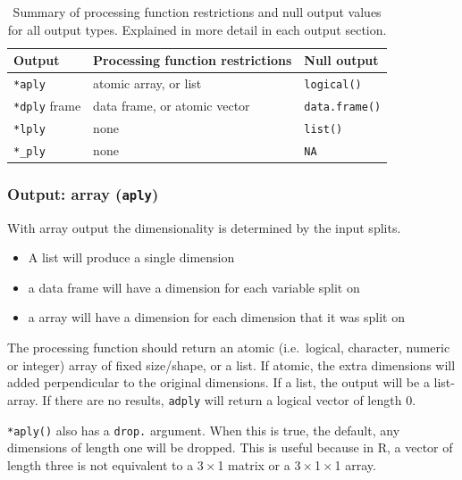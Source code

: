 \documentclass[letterpage]{scrartcl}
\newcommand{\code}[1]{\lstinline!#1!}
\newcommand{\f}[1]{\lstinline!#1()!}
\begin{document}
\begin{table}
  \begin{center}
  \begin{tabular}{lll}
    \toprule
    Output & Processing function restrictions & Null output \\
    \midrule
     \code{*aply} & atomic array, or list & \f{logical} \\
     \code{*dply} frame  & data frame, or atomic vector & \f{data.frame}\\
     \code{*lply} & none & \f{list} \\
     \code{*_ply} & none & \code{NA} \\
     \bottomrule  
  \end{tabular}
  \end{center}
  \caption{Summary of processing function restrictions and null output values for all output types.  Explained in more detail in each output section. }
  \label{tbl:restrictions}
\end{table}


\subsubsection{Output: array ({\tt *aply})}

With array output the dimensionality is determined by the input splits.  

\begin{itemize}
  \item A list will produce a single dimension
  \item a data frame will have a dimension for each variable split on
  \item a array will have a dimension for each dimension that it was split on
  
\end{itemize}

The processing function should return an atomic (i.e.\ logical, character, numeric or integer) array of fixed size/shape, or a list.  If atomic, the extra dimensions will added perpendicular to the original dimensions.  If a list, the output will be a list-array. If there are no results, {\tt adply} will return a logical vector of length 0.

\f{*aply} also has a \code{drop.} argument.  When this is true, the default, any dimensions of length one will be dropped.  This is useful because in R, a vector of length three is not equivalent to a 3\,$\times$\,1 matrix or a 3\,$\times$\,1\,$\times$\,1 array.
\end{document}
